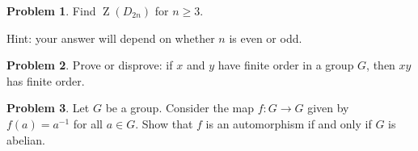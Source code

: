 \documentclass[11pt]{article}
\DeclareMathOperator{\Z}{Z}
\theoremstyle{definition}
\newtheorem{problem}{Problem}
\begin{document}
\begin{problem}
Find $\Z(D_{2n})$ for $n \geqslant 3$.  

\noindent Hint: your answer will depend on whether $n$ is even or odd.
\end{problem}




\begin{problem}
	Prove or disprove: if $x$ and $y$ have finite order in a group $G$, then $xy$ has finite order.
\end{problem}



\begin{problem}
Let $G$ be a group. Consider the map $f \!: G \longrightarrow G$ given by $f(a)=a^{-1}$ for all $a\in G$. Show that $f$ is an automorphism if and only if $G$ is abelian.
\end{problem}
\end{document}

